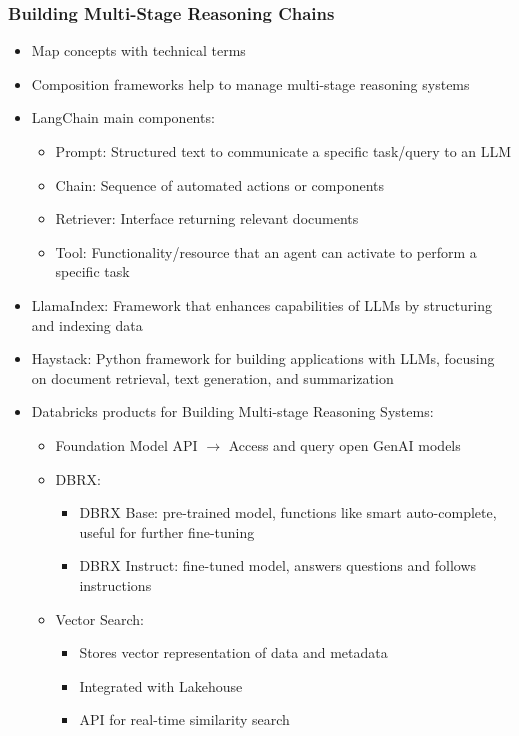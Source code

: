 \documentclass[11pt]{scrartcl}
\begin{document}
\subsubsection*{Building Multi-Stage Reasoning Chains}
\begin{itemize}
	\item Map concepts with technical terms
	\item Composition frameworks help to manage multi-stage reasoning systems
	\item LangChain main components:
	\begin{itemize}
		\item Prompt: Structured text to communicate a specific task/query to an LLM
		\item Chain: Sequence of automated actions or components
		\item Retriever: Interface returning relevant documents
		\item Tool: Functionality/resource that an agent can activate to perform a specific task
	\end{itemize}
	\item LlamaIndex: Framework that enhances capabilities of LLMs by structuring and indexing data
	\item Haystack: Python framework for building applications with LLMs, focusing on document retrieval, text generation, and summarization
	\item Databricks products for Building Multi-stage Reasoning Systems:
	\begin{itemize}
		\item Foundation Model API $\to$ Access and query open GenAI models
		\item DBRX:
		\begin{itemize}
			\item DBRX Base: pre-trained model, functions like smart auto-complete, useful for further fine-tuning
			\item DBRX Instruct: fine-tuned model, answers questions and follows instructions
		\end{itemize}
		\item Vector Search:
		\begin{itemize}
			\item Stores vector representation of data and metadata
			\item Integrated with Lakehouse
			\item API for real-time similarity search
		\end{itemize}
	\end{itemize}
\end{itemize}
\end{document}
